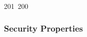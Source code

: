 201~200~\documentclass{article}
\begin{document}
	                                                                                                                                                                                                                                                                                                	                                                                                                                                        	    	                                                                                                	                                                                                                                                                                                                                                                                                                                                	                                                                        	                                                                        	                                                                                                                                        	                                                                                                                                                                                                                        	                                                                                                                            	                                                                	                                                                                                                                                                                    \subsubsection{Security Properties}
\end{document}
